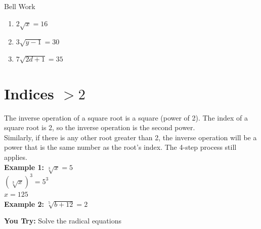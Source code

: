 \documentclass[12pt]{article}
\begin{document}
\pagebreak

\begin{Large}
	\begin{center}
		Bell Work\\
	\end{center}
\end{Large}

\begin{enumerate}
\item $2\sqrt{x}=16$\\

\vspace{1in}

\item $3\sqrt{y-1}=30$\\

\vspace{1in}

\item $7\sqrt{2d+1}=35$
\end{enumerate}

\pagebreak

\section{Indices $>2$}

The inverse operation of a square root is a square (power of 2). The index of a square root is 2, so the inverse operation is the second power.\\

Similarly, if there is any other root greater than 2, the inverse operation will be a power that is the same number as the root's index. The 4-step process still applies.\\

\textbf{Example 1:} $\sqrt[3]{x}=5$\\

$\left(\sqrt[3]{x}\right)^3=5^3$\\ $x=125$\\

\textbf{Example 2:} $\sqrt[5]{b+12}=2$\\

	\vspace{1in}

\textbf{You Try:} Solve the radical equations\\
\end{document}
